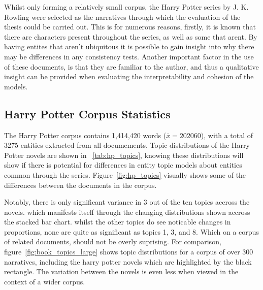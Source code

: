\documentclass[10pt]{report}
\begin{document}
Whilst only forming a relatively small corpus, the Harry Potter series by J. K. Rowling were selected as the narratives through which the evaluation of the thesis could be carried out. This is for numerous reasons, firstly, it is known that there are characters present throughout the series, as well as some that arent. By having entites that aren't ubiquitous it is possible to gain insight into why there may be differences in any consistency tests. Another important factor in the use of these documents, is that they are familiar to the author, and thus a qualitative insight can be provided when evaluating the interpretability and cohesion of the models.

\subsection{Harry Potter Corpus Statistics}

The Harry Potter corpus contains 1,414,420 words ($\bar{x} = 202060$), with a total of 3275 entities extracted from all documements. Topic distributions of the Harry Potter novels are shown in ~\ref{tab:hp_topics}, knowing these distributions will show if there is potential for differences in entity topic models about entities common through the series. Figure~\ref{fig:hp_topics} visually shows some of the differences between the documents in the corpus.

Notably, there is only significant variance in 3 out of the ten topics accross the novels. which manifests itself through the changing distributions shown accross the stacked bar chart. whilst the other topics do see noticable changes in proportions, none are quite as significant as topics 1, 3, and 8. Which on a corpus of related documents, should not be overly suprising. For comparison, figure~\ref{fig:book_topics_large} shows topic distributions for a corpus of over 300 narratives, including the harry potter novels which are highlighted by the black rectangle. The variation between the novels is even less when viewed in the context of a wider corpus.
\end{document}
